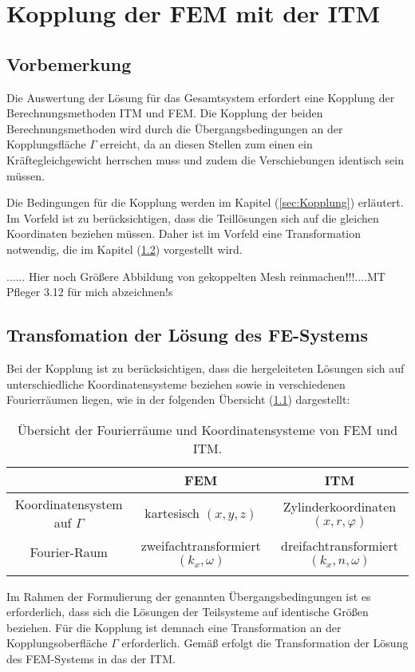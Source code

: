 \chapter{Kopplung der FEM mit der ITM}
\label{cha:Kopplung}

\section{Vorbemerkung}
\label{sec:Vorbem_Kopplung}

Die Auswertung der Lösung für das Gesamtsystem erfordert eine Kopplung der Berechnungsmethoden ITM und FEM.
Die Kopplung der beiden Berechnungsmethoden wird durch die Übergangsbedingungen an der Kopplungsfläche $\Gamma$ erreicht, da an diesen Stellen zum einen ein Kräftegleichgewicht herrschen muss und zudem die Verschiebungen identisch sein müssen.

Die Bedingungen für die Kopplung werden im Kapitel (\ref{sec:Kopplung}) erläutert. Im Vorfeld ist zu berücksichtigen, dass die Teillösungen sich auf die gleichen Koordinaten beziehen müssen. Daher ist im Vorfeld eine Transformation notwendig, die im Kapitel (\ref{sec:Transformation_Kopplung}) vorgestellt wird.

...... Hier noch Größere Abbildung von gekoppelten Mesh reinmachen!!!....MT Pfleger 3.12 für mich abzeichnen!s

\section{Transfomation der Lösung des FE-Systems}
\label{sec:Transformation_Kopplung}

Bei der Kopplung ist zu berücksichtigen, dass die hergeleiteten Lösungen sich auf unterschiedliche Koordinatensysteme beziehen sowie in verschiedenen Fourierräumen liegen, wie in der folgenden Übersicht (\ref{tab:Übersichtstabelle}) dargestellt:
\begin{table}[htb]
	\centering
	\normalsize
	\begin{tabular}{ccc}
		\firsthline
		& \textbf{FEM} & \textbf{ITM} \\\hline
		Koordinatensystem auf $\Gamma$ & kartesisch $(x,y,z)$ & Zylinderkoordinaten $(x,r,\varphi)$ \\
		Fourier-Raum                     & zweifachtransformiert $(k_x,\omega)$        & dreifachtransformiert$(k_x,n,\omega)$ \\\lasthline
	\end{tabular}
	\caption{Übersicht der Fourierräume und Koordinatensysteme von FEM und ITM.}
	\label{tab:Übersichtstabelle}
\end{table}
Im Rahmen der Formulierung der genannten Übergangsbedingungen ist es erforderlich, dass sich die Lösungen der Teilsysteme auf identische Größen beziehen.
Für die Kopplung ist demnach eine Transformation an der Kopplungsoberfläche $\Gamma$ erforderlich. Gemäß \cite{Freisinger_Hackenberg2020} erfolgt die Transformation der Lösung des FEM-Systems in das der ITM.

